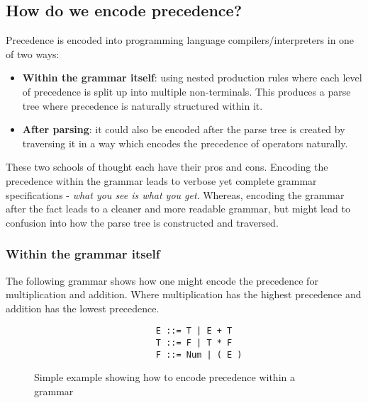 \documentclass[12pt, letterpaper]{article}
\theoremstyle{definition}
\begin{document}
\subsection{How do we encode precedence?}

Precedence is encoded into programming language compilers/interpreters in one of two ways:

\begin{itemize}
    \item \textbf{Within the grammar itself}: using nested production rules where each level of precedence is split up into multiple non-terminals. This produces a parse tree where precedence is naturally structured within it.
    \item \textbf{After parsing}: it could also be encoded after the parse tree is created by traversing it in a way which encodes the precedence of operators naturally.
\end{itemize}

These two schools of thought each have their pros and cons. Encoding the precedence within the grammar leads to verbose yet complete grammar specifications - \textit{what you see is what you get}. Whereas, encoding the grammar after the fact leads to a cleaner and more readable grammar, but might lead to confusion into how the parse tree is constructed and traversed.

\subsubsection{Within the grammar itself}

The following grammar shows how one might encode the precedence for multiplication and addition. Where multiplication has the highest precedence and addition has the lowest precedence.

\begin{figure}[H]
    \begin{center}
        \begin{verbatim}            
                        E ::= T | E + T
                        T ::= F | T * F
                        F ::= Num | ( E )
        \end{verbatim}
    \end{center}
    \vspace{-1.5em}
    \caption{Simple example showing how to encode precedence within a grammar}
\end{figure}
\end{document}
